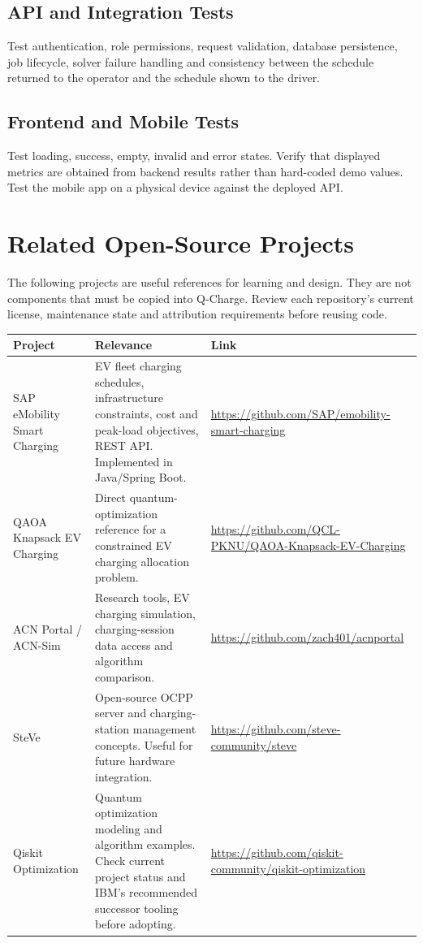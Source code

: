\documentclass[11pt,a4paper]{article}
\begin{document}
\subsection{API and Integration Tests}
Test authentication, role permissions, request validation, database persistence, job lifecycle, solver failure handling and consistency between the schedule returned to the operator and the schedule shown to the driver.

\subsection{Frontend and Mobile Tests}
Test loading, success, empty, invalid and error states. Verify that displayed metrics are obtained from backend results rather than hard-coded demo values. Test the mobile app on a physical device against the deployed API.

\section{Related Open-Source Projects}

The following projects are useful references for learning and design. They are not components that must be copied into Q-Charge. Review each repository's current license, maintenance state and attribution requirements before reusing code.

\begin{longtable}{p{3.2cm}p{5.4cm}p{4.3cm}}
\toprule
\textbf{Project} & \textbf{Relevance} & \textbf{Link} \\
\midrule
SAP eMobility Smart Charging & EV fleet charging schedules, infrastructure constraints, cost and peak-load objectives, REST API. Implemented in Java/Spring Boot. & \url{https://github.com/SAP/emobility-smart-charging} \\
QAOA Knapsack EV Charging & Direct quantum-optimization reference for a constrained EV charging allocation problem. & \url{https://github.com/QCL-PKNU/QAOA-Knapsack-EV-Charging} \\
ACN Portal / ACN-Sim & Research tools, EV charging simulation, charging-session data access and algorithm comparison. & \url{https://github.com/zach401/acnportal} \\
SteVe & Open-source OCPP server and charging-station management concepts. Useful for future hardware integration. & \url{https://github.com/steve-community/steve} \\
Qiskit Optimization & Quantum optimization modeling and algorithm examples. Check current project status and IBM's recommended successor tooling before adopting. & \url{https://github.com/qiskit-community/qiskit-optimization} \\
\bottomrule
\end{longtable}
\end{document}
